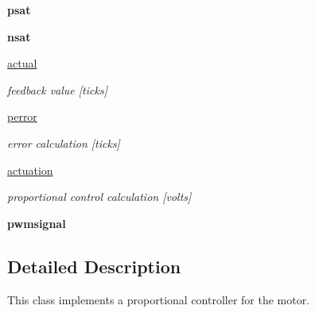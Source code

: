 \begin{DoxyCompactItemize}
\item 
{\bfseries psat}\hypertarget{classpcontroller_1_1Pcontroller_a68ca5d0666011e2ac2a1c709517fdfda}{}\label{classpcontroller_1_1Pcontroller_a68ca5d0666011e2ac2a1c709517fdfda}

\item 
{\bfseries nsat}\hypertarget{classpcontroller_1_1Pcontroller_a1cefb27c1ae73bc1acc54aee911aa9fb}{}\label{classpcontroller_1_1Pcontroller_a1cefb27c1ae73bc1acc54aee911aa9fb}

\item 
\hyperlink{classpcontroller_1_1Pcontroller_adc23f159a284c2e35a9ff09025de0fd6}{actual}\hypertarget{classpcontroller_1_1Pcontroller_adc23f159a284c2e35a9ff09025de0fd6}{}\label{classpcontroller_1_1Pcontroller_adc23f159a284c2e35a9ff09025de0fd6}

\begin{DoxyCompactList}\small\item\em feedback value \mbox{[}ticks\mbox{]} \end{DoxyCompactList}\item 
\hyperlink{classpcontroller_1_1Pcontroller_ad6ac6a957e6fb2d94734f46a444f15d9}{perror}\hypertarget{classpcontroller_1_1Pcontroller_ad6ac6a957e6fb2d94734f46a444f15d9}{}\label{classpcontroller_1_1Pcontroller_ad6ac6a957e6fb2d94734f46a444f15d9}

\begin{DoxyCompactList}\small\item\em error calculation \mbox{[}ticks\mbox{]} \end{DoxyCompactList}\item 
\hyperlink{classpcontroller_1_1Pcontroller_a394153e4387285a0dab405646a2ed12b}{actuation}\hypertarget{classpcontroller_1_1Pcontroller_a394153e4387285a0dab405646a2ed12b}{}\label{classpcontroller_1_1Pcontroller_a394153e4387285a0dab405646a2ed12b}

\begin{DoxyCompactList}\small\item\em proportional control calculation \mbox{[}volts\mbox{]} \end{DoxyCompactList}\item 
{\bfseries pwmsignal}\hypertarget{classpcontroller_1_1Pcontroller_a4974e5f4ebbca12bf50108fe0be46e93}{}\label{classpcontroller_1_1Pcontroller_a4974e5f4ebbca12bf50108fe0be46e93}

\end{DoxyCompactItemize}


\subsection{Detailed Description}
This class implements a proportional controller for the motor. 

